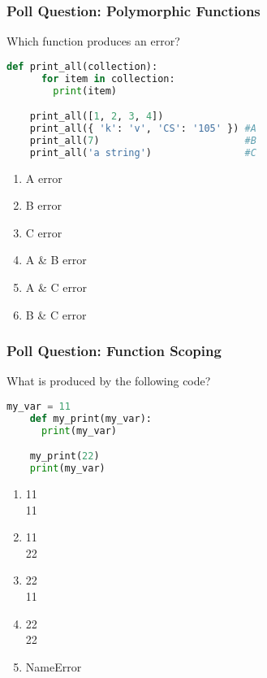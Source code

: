 \documentclass{beamer}
\begin{document}
%
%
\begin{frame}[fragile]
  \frametitle{Poll Question: Polymorphic Functions}
  Which function produces an error?\\
  \vfill
  \begin{minipage}{0.69\textwidth}
    \begin{lstlisting}[language=Python, autogobble]
    def print_all(collection):
      for item in collection:
        print(item)

    print_all([1, 2, 3, 4])
    print_all({ 'k': 'v', 'CS': '105' }) #A
    print_all(7)                         #B
    print_all('a string')                #C
    \end{lstlisting}
  \end{minipage}
  \hfill
  \begin{minipage}{0.29\textwidth}
    \begin{enumerate}[A]
      \item A error
      \item B error
      \item C error
      \item A \& B error
      \item A \& C error
      \item B \& C error
    \end{enumerate}
  \end{minipage}
\end{frame}


%
%
\begin{frame}[fragile]
  \frametitle{Poll Question: Function Scoping}
  \begin{minipage}{0.69\textwidth}
    What is produced by the following code?
    \begin{lstlisting}[language=Python, autogobble]
    my_var = 11
    def my_print(my_var):
      print(my_var)

    my_print(22)
    print(my_var)
    \end{lstlisting}
  \end{minipage}
  \hfill
  \begin{minipage}{0.29\textwidth}
    \begin{enumerate}[A]
      \item 11\\11
      \item 11\\22
      \item 22\\11
      \item 22\\22
      \item NameError
    \end{enumerate}
  \end{minipage}
\end{frame}
\end{document}
